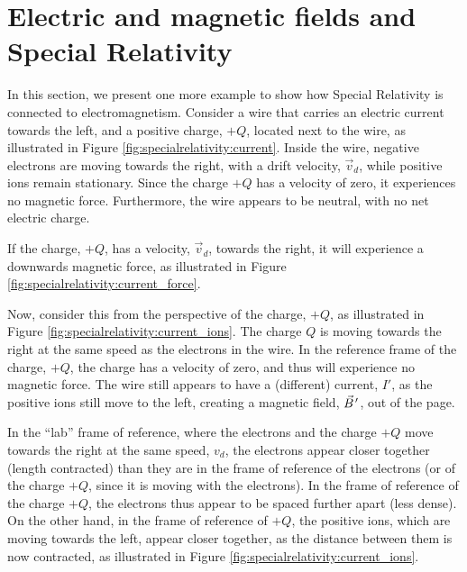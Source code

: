 \section{Electric and magnetic fields and Special Relativity}
In this section, we present one more example to show how Special Relativity is connected to electromagnetism. Consider a wire that carries an electric current towards the left, and a positive charge, $+Q$, located next to the wire, as illustrated in Figure \ref{fig:specialrelativity:current}.
Inside the wire, negative electrons are moving towards the right, with a drift velocity, $\vec v_d$, while positive ions remain stationary. Since the charge $+Q$ has a velocity of zero, it experiences no magnetic force. Furthermore, the wire appears to be neutral, with no net electric charge.

If the charge, $+Q$, has a velocity, $\vec v_d$, towards the right, it will experience a downwards magnetic force, as illustrated in Figure \ref{fig:specialrelativity:current_force}.

Now, consider this from the perspective of the charge, $+Q$, as illustrated in Figure \ref{fig:specialrelativity:current_ions}. The charge $Q$ is moving towards the right at the same speed as the electrons in the wire. In the reference frame of the charge, $+Q$, the charge has a velocity of zero, and thus will experience no magnetic force. The wire still appears to have a (different) current, $I'$, as the positive ions still move to the left, creating a magnetic field, $\pvec B'$, out of the page.

In the ``lab'' frame of reference, where the electrons and the charge $+Q$ move towards the right at the same speed, $v_d$, the electrons appear closer together (length contracted) than they are in the frame of reference of the electrons (or of the charge $+Q$, since it is moving with the electrons). In the frame of reference of the charge $+Q$, the electrons thus appear to be spaced further apart (less dense). On the other hand, in the frame of reference of $+Q$, the positive ions, which are moving towards the left, appear closer together, as the distance between them is now contracted, as illustrated in Figure \ref{fig:specialrelativity:current_ions}.


